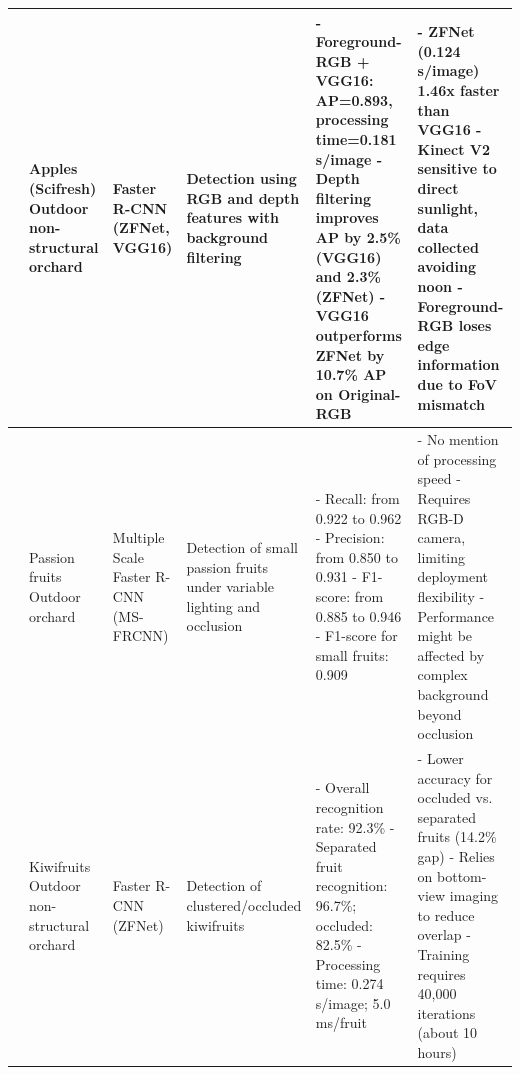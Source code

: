 \documentclass[a4paper,fleqn]{cas-dc}
\begin{document}
\begin{table}[htbp]
\begin{tabular}{@{}p{}p{}p{}p{}p{}p{}@{}}
	\cite{fu2020faster} \newline 2020 & Apples (Scifresh) \newline Outdoor non-structural orchard  & Faster R-CNN (ZFNet, VGG16) & Detection using RGB and depth features with background filtering & - Foreground-RGB + VGG16: AP=0.893, processing time=0.181 s/image \newline - Depth filtering improves AP by 2.5\% (VGG16) and 2.3\% (ZFNet) \newline - VGG16 outperforms ZFNet by 10.7\% AP on Original-RGB & - ZFNet (0.124 s/image) 1.46x faster than VGG16 \newline - Kinect V2 sensitive to direct sunlight, data collected avoiding noon \newline - Foreground-RGB loses edge information due to FoV mismatch \\ \midrule
	
	\cite{tu2020passion} \newline 2020 & Passion fruits \newline Outdoor orchard & Multiple Scale Faster R-CNN (MS-FRCNN) & Detection of small passion fruits under variable lighting and occlusion & - Recall: from 0.922 to 0.962 \newline - Precision: from 0.850 to 0.931 \newline - F1-score: from 0.885 to 0.946 \newline - F1-score for small fruits: 0.909 & - No mention of processing speed \newline - Requires RGB-D camera, limiting deployment flexibility \newline - Performance might be affected by complex background beyond occlusion \\ \midrule
	
	\cite{fu2018kiwifruit} \newline 2018 & Kiwifruits \newline Outdoor non-structural orchard & Faster R-CNN (ZFNet) & Detection of clustered/occluded kiwifruits & - Overall recognition rate: 92.3\% \newline - Separated fruit recognition: 96.7\%; occluded: 82.5\% \newline - Processing time: 0.274 s/image; 5.0 ms/fruit & - Lower accuracy for occluded vs. separated fruits (14.2\% gap) \newline - Relies on bottom-view imaging to reduce overlap \newline - Training requires 40,000 iterations (about 10 hours) \\ \midrule


\end{tabular}
\end{table}
\end{document}
